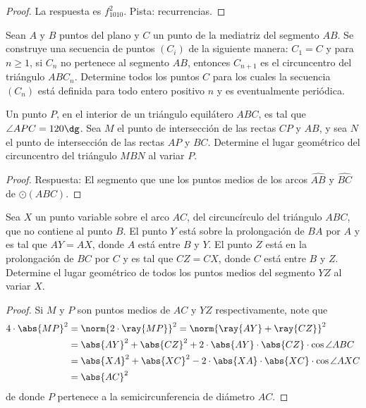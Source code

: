 \begin{proof}
	La respuesta es $f_{1010}^2$. Pista: recurrencias.
\end{proof}

\begin{probEG}[IberoAmerican 1999/6]
	Sean $A$ y $B$ puntos del plano y $C$ un punto de la mediatriz del segmento $AB$. Se construye una secuencia de puntos $(C_i)$ de la siguiente manera: $C_1=C$ y para $n\ge 1$, si $C_n$ no pertenece al segmento $AB$, entonces $C_{n+1}$ es el circuncentro del triángulo $ABC_n$. Determine todos los puntos $C$ para los cuales la secuencia $(C_n)$ está definida para todo entero positivo $n$ y es eventualmente periódica.
\end{probEG}

\begin{probEG}[IberoAmerican 2002/3]
	Un punto $P$, en el interior de un triángulo equilátero $ABC$, es tal que $\angle APC=120\dg$. Sea $M$ el punto de intersección de las rectas $CP$ y $AB$, y sea $N$ el punto de intersección de las rectas $AP$ y $BC$. Determine el lugar geométrico del circuncentro del triángulo $MBN$ al variar $P$.
\end{probEG}

\begin{proof}
	Respuesta: El segmento que une los puntos medios de los arcos $\widehat{AB}$ y $\widehat{BC}$ de $\odot(ABC)$.
\end{proof}

\begin{probMB}
	Sea $X$ un punto variable sobre el arco $AC$, del circuncírculo del triángulo $ABC$, que no contiene al punto $B$. El punto $Y$ está sobre la prolongación de $BA$ por $A$ y es tal que $AY=AX$, donde $A$ está entre $B$ y $Y$. El punto $Z$ está en la prolongación de $BC$ por $C$ y es tal que $CZ=CX$, donde $C$ está entre $B$ y $Z$. Determine el lugar geométrico de todos los puntos medios del segmento $YZ$ al variar $X$.
\end{probMB}

\begin{proof}
	Si $M$ y $P$ son puntos medios de $AC$ y $YZ$ respectivamente, note que
	\begin{align*}
		4\cdot\abs{MP}^2
		&=\norm{2\cdot\ray{MP}}^2=\norm{\ray{AY}+\ray{CZ}}^2\\
		&=\abs{AY}^2+\abs{CZ}^2+2\cdot\abs{AY}\cdot\abs{CZ}\cdot\cos{\angle ABC}\\
		&=\abs{XA}^2+\abs{XC}^2-2\cdot\abs{XA}\cdot\abs{XC}\cdot\cos{\angle AXC}\\
		&=\abs{AC}^2
	\end{align*}
	de donde $P$ pertenece a la semicircunferencia de diámetro $AC$.
\end{proof}
